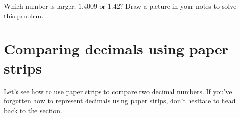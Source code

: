\documentclass{ximera}
\begin{document}
\begin{question}
Which number is larger: $1.4009$ or $1.42$? Draw a picture in your notes to solve this problem.

\begin{multipleChoice}
\end{multipleChoice}
\end{question}


\section{Comparing decimals using paper strips}


Let's see how to use paper strips to compare two decimal numbers. If you've forgotten how to represent decimals using paper strips, don't hesitate to head back to the  section.
\end{document}
